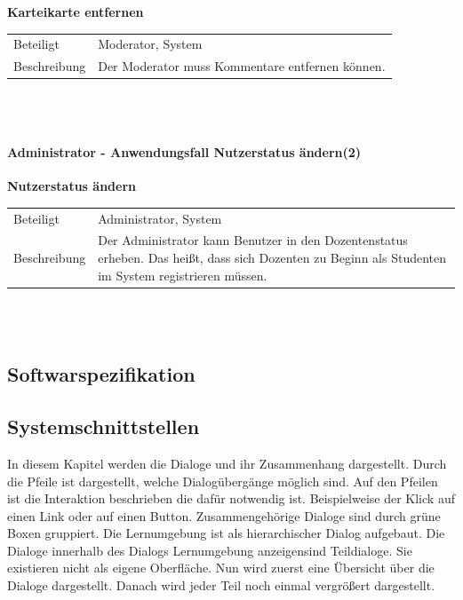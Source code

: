 \documentclass[12pt,a4paper]{article}
\begin{document}
{\textbf{Karteikarte entfernen}\\
\begin{tabular}{l|p{12cm}}
\hline 
Beteiligt & Moderator, System \\ 
Beschreibung & Der Moderator muss Kommentare entfernen können. \\ 
\end{tabular}\\\\

\paragraph{Administrator - Anwendungsfall \glqq Nutzerstatus ändern\grqq (2)}\mbox{}

\textbf{Nutzerstatus ändern}\\
\begin{tabular}{l|p{12cm}}
\hline 
Beteiligt & Administrator, System \\ 
Beschreibung & Der Administrator kann Benutzer in den Dozentenstatus erheben. Das heißt, dass sich Dozenten zu Beginn als Studenten im System registrieren müssen. \\ 
\end{tabular}\\\\ 

\begin{landscape}
\section{Softwarspezifikation}
\subsection{Systemschnittstellen}
In diesem Kapitel werden die Dialoge und ihr Zusammenhang dargestellt. Durch die Pfeile ist dargestellt, welche Dialogübergänge möglich sind. Auf den Pfeilen ist die Interaktion beschrieben die dafür notwendig ist. Beispielweise der Klick auf einen Link oder auf einen Button. Zusammengehörige Dialoge sind durch grüne Boxen gruppiert. Die Lernumgebung ist als hierarchischer Dialog aufgebaut. Die Dialoge innerhalb des Dialogs \glqq Lernumgebung anzeigen\grqq sind Teildialoge. Sie existieren  nicht als eigene Oberfläche. Nun wird zuerst eine Übersicht über die Dialoge dargestellt. Danach wird jeder Teil noch einmal vergrößert dargestellt.


\end{landscape}}
\end{document}
